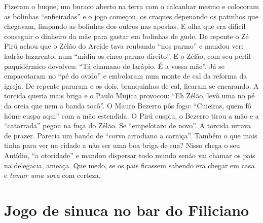 \documentclass[12pt,brazil,]{book}
\begin{document}
Fizeram o buque, um buraco aberto na terra com o calcanhar mesmo e
colocoram as bolinhas ``enfieiradas'' e o jogo começou, os craques
depenando os patinhos que chegavam, limpando as bolinhas dos outros nas
apostas. E olha que era difícil conseguir o dinheiro da mãe para gastar
em bolinhas de gude. De repente o Zé Pirú achou que o Zélão do Arcide
tava roubando ``nos parmo'' e mandou ver: ladrão lazarento, num ``midiu
os cinco parmo direito''. E o Zélão, com seu perfil paquidérmico
devolveu: ``Tá chamano de larápio. É a vossa mãe''. Já se empacotaram no
``pé do ovido'' e embolaram num monte de cal da reforma da igreja. De
repente pararam e os dois, branquinhos de cal, ficaram se encarando. A
torcida queria mais briga e o Paulo Mujica provocou: ``Eh Zélão, levô
uma no pé da oreia que nem a banda tocô''. O Mauro Bezerro pôs fogo:
``Cuieiras, quem fô hóme cuspa aqui'' com a mão estendida. O Pirú
cuspiu, o Bezerro tirou a mão e a ``catarrada'' pegou na fuça do Zélão.
Se ``empelotaro de novo''. A torcida urrava de prazer. Parecia um bando
de ``corvo arrodiano a carniça''. Também o que mais tinha para ver na
cidade a não ser uma boa briga de rua? Nisso chega o seu Antídio, ``a
otoridade'' e mandou dispersar todo mundo senão vai chamar os pais na
delegacia, ameaça. Que medo, se os pais ficassem sabendo era chegar em
casa e \emph{tomar uma sova} com certeza.

\section{Jogo de sinuca no bar do
Filiciano}\label{jogo-de-sinuca-no-bar-do-filiciano}
\end{document}

